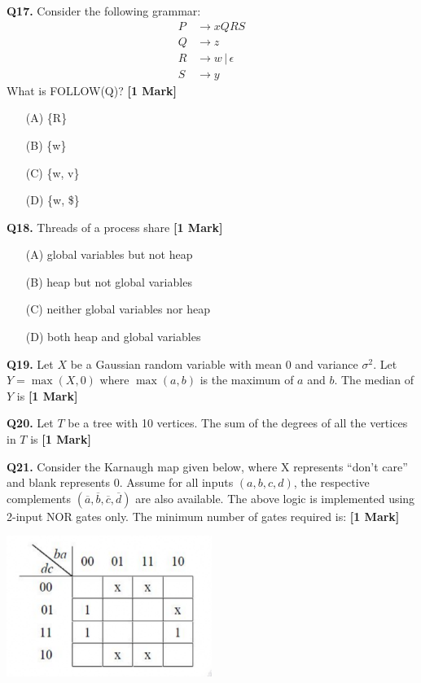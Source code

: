 \documentclass[11pt]{article}
\newcommand{\questiona}[2]{
    \noindent\textbf{Q#2.} #1 \hfill \textbf{[1 Mark]}
}
\begin{document}
\questiona{Consider the following grammar:  
\[
\begin{aligned}
P &\rightarrow xQRS \\
Q &\rightarrow z \\
R &\rightarrow w \,|\, \epsilon\\
S &\rightarrow y
\end{aligned}
\]
What is FOLLOW(Q)?}{17}
\begin{enumerate}
    \item[(A)] \{R\}  
    \item[(B)] \{w\}  
    \item[(C)] \{w, v\}  
    \item[(D)] \{w, \$\}  
\end{enumerate}
\vspace{0.5cm}

\questiona{Threads of a process share}{18}
\begin{enumerate}
    \item[(A)] global variables but not heap  
    \item[(B)] heap but not global variables  
    \item[(C)] neither global variables nor heap  
    \item[(D)] both heap and global variables  
\end{enumerate}
\vspace{0.5cm}

\questiona{Let \( X \) be a Gaussian random variable with mean 0 and variance \( \sigma^2 \). Let \( Y = \max(X, 0) \) where \( \max(a, b) \) is the maximum of \( a \) and \( b \). The median of \( Y \) is}{19}

\vspace{0.5cm}

\questiona{Let \( T \) be a tree with 10 vertices. The sum of the degrees of all the vertices in \( T \) is}{20}

\vspace{0.5cm}

\questiona{Consider the Karnaugh map given below, where X represents “don’t care” and blank represents 0.  
Assume for all inputs \( (a, b, c, d) \), the respective complements \( (\overline{a}, \overline{b}, \overline{c}, \overline{d}) \) are also available.  
The above logic is implemented using 2-input NOR gates only. The minimum number of gates required is:}{21}
\begin{center}
\includegraphics[width=0.5\textwidth]{figures/21.png}
\end{center}
\end{document}
